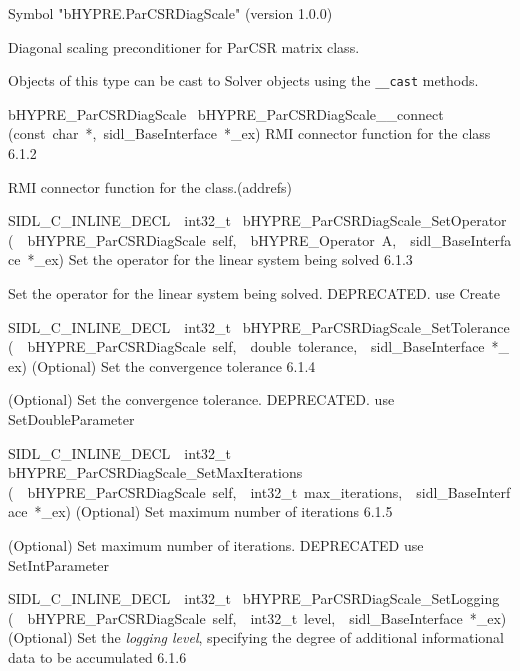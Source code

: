 \documentclass{article}
\begin{document}
\begin{cxxentry}
\begin{cxxentry}
\begin{cxxvariable}
\begin{cxxdoc}
Symbol "bHYPRE.ParCSRDiagScale" (version 1.0.0)

Diagonal scaling preconditioner for ParCSR matrix class.

Objects of this type can be cast to Solver objects using the
{\tt \_\_cast} methods.
\end{cxxdoc}
\end{cxxvariable}
\begin{cxxfunction}
{bHYPRE\_ParCSRDiagScale\ }
        {bHYPRE\_ParCSRDiagScale\_\_connect}
        {(const\ char\ *,\ sidl\_BaseInterface\ *\_ex)}
        {
RMI connector function for the class}
        {6.1.2}
\begin{cxxdoc}

RMI connector function for the class.(addrefs)
\end{cxxdoc}
\end{cxxfunction}
\begin{cxxfunction}
{SIDL\_C\_INLINE\_DECL\ \ int32\_t\ }
        {bHYPRE\_ParCSRDiagScale\_SetOperator}
        {(\ \ bHYPRE\_ParCSRDiagScale\ self,\ \ bHYPRE\_Operator\ A,\ \ sidl\_BaseInterface\ *\_ex)}
        {
Set the operator for the linear system being solved}
        {6.1.3}
\begin{cxxdoc}

Set the operator for the linear system being solved.
DEPRECATED.  use Create
\end{cxxdoc}
\end{cxxfunction}
\begin{cxxfunction}
{SIDL\_C\_INLINE\_DECL\ \ int32\_t\ }
        {bHYPRE\_ParCSRDiagScale\_SetTolerance}
        {(\ \ bHYPRE\_ParCSRDiagScale\ self,\ \ double\ tolerance,\ \ sidl\_BaseInterface\ *\_ex)}
        {
(Optional) Set the convergence tolerance}
        {6.1.4}
\begin{cxxdoc}

(Optional) Set the convergence tolerance.
DEPRECATED.  use SetDoubleParameter
\end{cxxdoc}
\end{cxxfunction}
\begin{cxxfunction}
{SIDL\_C\_INLINE\_DECL\ \ int32\_t\ }
        {bHYPRE\_ParCSRDiagScale\_SetMaxIterations}
        {(\ \ bHYPRE\_ParCSRDiagScale\ self,\ \ int32\_t\ max\_iterations,\ \ sidl\_BaseInterface\ *\_ex)}
        {
(Optional) Set maximum number of iterations}
        {6.1.5}
\begin{cxxdoc}

(Optional) Set maximum number of iterations.
DEPRECATED   use SetIntParameter
\end{cxxdoc}
\end{cxxfunction}
\begin{cxxfunction}
{SIDL\_C\_INLINE\_DECL\ \ int32\_t\ }
        {bHYPRE\_ParCSRDiagScale\_SetLogging}
        {(\ \ bHYPRE\_ParCSRDiagScale\ self,\ \ int32\_t\ level,\ \ sidl\_BaseInterface\ *\_ex)}
        {
(Optional) Set the {\it logging level}, specifying the degree
of additional informational data to be accumulated}
        {6.1.6}
\begin{cxxdoc}


\end{cxxdoc}
\end{cxxfunction}
\end{cxxentry}
\end{cxxentry}
\end{document}
